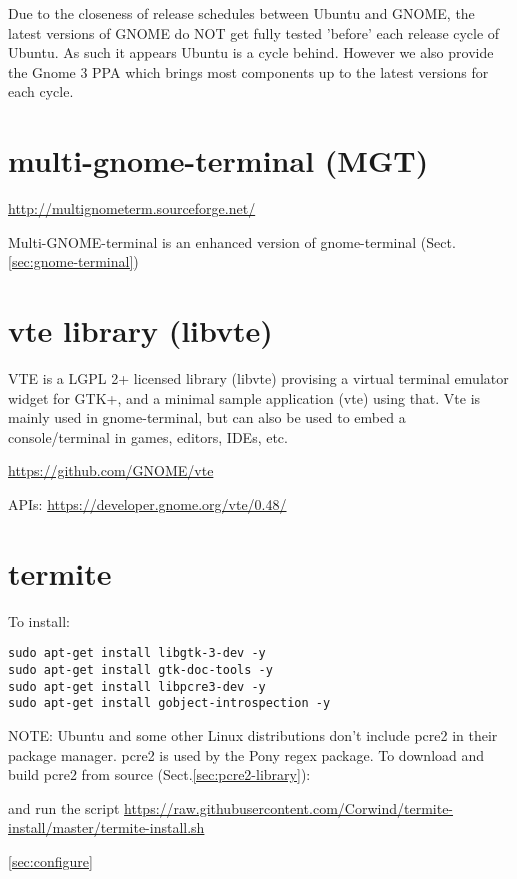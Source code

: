 Due to the closeness of release schedules between Ubuntu and GNOME, the latest
versions of GNOME do NOT get fully tested 'before' each release cycle of Ubuntu.
As such it appears Ubuntu is a cycle behind. However we also provide the Gnome 3
PPA which brings most components up to the latest versions for each cycle.


\section{multi-gnome-terminal (MGT)}
\label{multi-gnome-terminal}

\url{http://multignometerm.sourceforge.net/}
 
Multi-GNOME-terminal is an enhanced version of gnome-terminal
(Sect.\ref{sec:gnome-terminal})

\section{vte library (libvte)}
\label{sec:vte}
\label{sec:libvte}

VTE is a LGPL 2+ licensed library (libvte) provising a virtual terminal emulator
widget for GTK+, and a minimal sample application (vte) using that.  Vte is
mainly used in gnome-terminal, but can also be used to embed a console/terminal
in games, editors, IDEs, etc.	

\url{https://github.com/GNOME/vte}

APIs: \url{https://developer.gnome.org/vte/0.48/}



\section{termite}
\label{sec:termite}

To install:
\begin{verbatim}
sudo apt-get install libgtk-3-dev -y
sudo apt-get install gtk-doc-tools -y
sudo apt-get install libpcre3-dev -y
sudo apt-get install gobject-introspection -y
\end{verbatim}

NOTE: Ubuntu and some other Linux distributions don't include pcre2 in their
package manager. pcre2 is used by the Pony regex package. To download and build
pcre2 from source (Sect.\ref{sec:pcre2-library}): 

and run the script
\url{https://raw.githubusercontent.com/Corwind/termite-install/master/termite-install.sh}

\ref{sec:configure}

